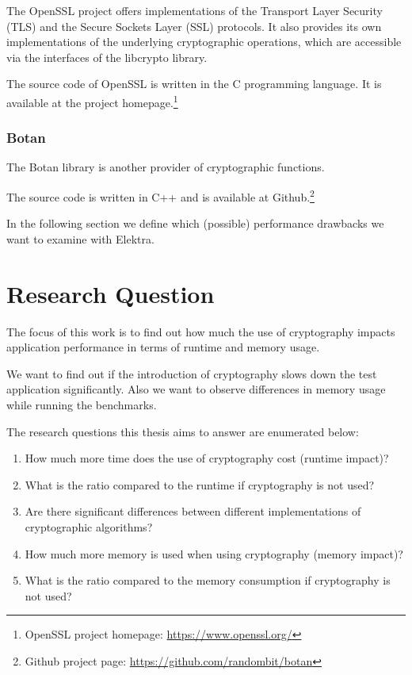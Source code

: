 The OpenSSL project offers implementations of the Transport Layer Security (TLS) and the Secure Sockets Layer (SSL) protocols.
It also provides its own implementations of the underlying cryptographic operations, which are accessible via the interfaces of the libcrypto library.

The source code of OpenSSL is written in the C programming language.
It is available at the project homepage.\footnote{OpenSSL project homepage: \url{https://www.openssl.org/}}

  \subsubsection{Botan}

The Botan library is another provider of cryptographic functions.

The source code is written in C++ and is available at Github.\footnote{Github project page: \url{https://github.com/randombit/botan}}



In the following section we define which (possible) performance drawbacks we want to examine with Elektra.

\section{Research Question}

The focus of this work is to find out how much the use of cryptography
impacts application performance in terms of runtime and memory
usage.

We want to find out if the introduction of cryptography slows down the test application significantly.
Also we want to observe differences in memory usage while running the benchmarks.

The research questions this thesis aims to answer are enumerated below:

\begin{enumerate}
\def\labelenumi{\arabic{enumi}.}
\tightlist
\item
  How much more time does the use of cryptography cost (runtime impact)?
\item
  What is the ratio compared to the runtime if cryptography is not used?
\item
  Are there significant differences between different implementations of cryptographic algorithms?
\item
  How much more memory is used when using cryptography (memory impact)?
\item
  What is the ratio compared to the memory consumption if cryptography
  is not used?
\end{enumerate}

